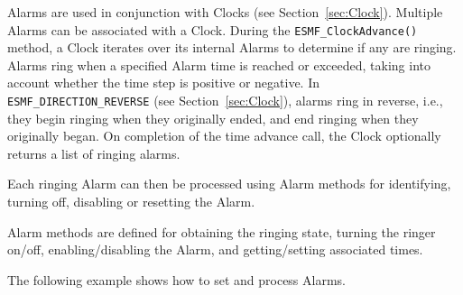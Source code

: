
Alarms are used in conjunction with Clocks (see Section~\ref{sec:Clock}).
Multiple Alarms can be associated with a Clock.  During the
{\tt ESMF\_ClockAdvance()} method, a Clock iterates over its internal Alarms
to determine if any are ringing.  Alarms ring when a specified Alarm 
time is reached or exceeded, taking into account whether the time step is
positive or negative.  In {\tt ESMF\_DIRECTION\_REVERSE}
(see Section~\ref{sec:Clock}), alarms ring in reverse, i.e., they begin
ringing when they originally ended, and end ringing when they originally
began.  On completion of the time advance call, the Clock optionally returns
a list of ringing alarms.

Each ringing Alarm can then be processed using Alarm methods for identifying,
turning off, disabling or resetting the Alarm.

Alarm methods are defined for obtaining the ringing state, turning the
ringer on/off, enabling/disabling the Alarm, and getting/setting 
associated times.

The following example shows how to set and process Alarms.
